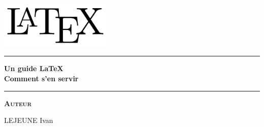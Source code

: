 \begin{titlepage}
\begin{center}
\vspace{2cm}
\includegraphics[width=0.4\textwidth]{resources/LaTeX_logo.png}~\\[1cm]
\vspace{2cm}

\hrule
\vspace{.5cm}
{\color{astral}\huge\bfseries{Un guide \LaTeX\\\vspace{1mm} Comment s'en servir}} %
\vspace{.5cm}

\hrule
\vspace{1.5cm}

\textsc{\textbf{Auteur}}\\
\vspace{.5cm}
\centering

LEJEUNE Ivan\\



\vspace{4cm}

\centering {} %
\end{center}
\end{titlepage}
